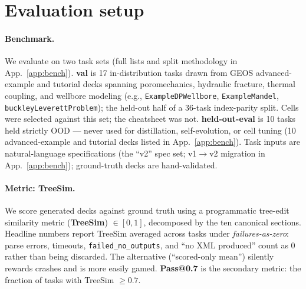 \documentclass{article}
\begin{document}
\section{Evaluation setup}
\label{sec:eval}

\paragraph{Benchmark.} We evaluate on two task sets (full lists and split methodology in App.~\ref{app:bench}). \textbf{val} is 17 in-distribution tasks drawn from GEOS advanced-example and tutorial decks spanning poromechanics, hydraulic fracture, thermal coupling, and wellbore modeling (e.g., \texttt{ExampleDPWellbore}, \texttt{ExampleMandel}, \texttt{buckleyLeverettProblem}); the held-out half of a 36-task index-parity split. Cells were selected against this set; the cheatsheet was not. \textbf{held-out-eval} is 10 tasks held strictly OOD --- never used for distillation, self-evolution, or cell tuning (10 advanced-example and tutorial decks listed in App.~\ref{app:bench}). Task inputs are natural-language specifications (the ``v2'' spec set; v1$\rightarrow$v2 migration in App.~\ref{app:bench}); ground-truth decks are hand-validated.

\paragraph{Metric: TreeSim.}\label{subsec:metric} We score generated decks against ground truth using a programmatic tree-edit similarity metric (\textbf{TreeSim}) $\in [0, 1]$, decomposed by the ten canonical sections. Headline numbers report TreeSim averaged across tasks under \emph{failures-as-zero}: parse errors, timeouts, \texttt{failed\_no\_outputs}, and ``no XML produced'' count as 0 rather than being discarded. The alternative (``scored-only mean'') silently rewards crashes and is more easily gamed. \textbf{Pass@0.7} is the secondary metric: the fraction of tasks with TreeSim $\geq 0.7$.
\end{document}
